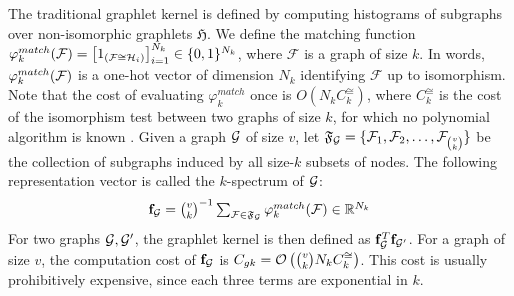 \documentclass{article}
\begin{document}
The traditional graphlet kernel is defined by computing histograms of subgraphs over non-isomorphic graphlets $\mathfrak{H}$. We define the matching function $\varphi_k^{match}(\mathcal{F}) = \left[ 1_{(\mathcal{F} \cong \mathcal{H}_i)}\right]_{i=1}^{N_k} \in \{0,1\}^{N_k}$, where $\mathcal{F}$ is a graph of size $k$. In words, $\varphi^{match}_k(\mathcal{F})$ is a one-hot vector of dimension $N_k$ identifying $\mathcal{F}$ up to isomorphism. Note that the cost of evaluating $\varphi_k^{match}$ once is $O\left(N_k C^{\cong}_k\right)$, where $C^{\cong}_k$ is the cost of the isomorphism test between two graphs of size $k$, for which no polynomial algorithm is known \cite{isomorphism_np}. 
%
Given a graph $\mathcal{G}$ of size $v$, let $\mathfrak{F}_{\mathcal{G}}=\{\mathcal{F}_1,\mathcal{F}_2,\ldots,\mathcal{F}_{\binom{v}{k}}\}$ be the collection of subgraphs induced by all size-$k$ subsets of nodes. The following representation vector is called the $k$-spectrum of $\mathcal{G}$:
\begin{equation}
\label{eq:gk}
\mathsmaller{\mathbf{f}_\G=\binom{v}{k}^{-1}\sum_{\mathcal{F}\in\mathfrak{F}_\mathcal{G}} \match (\mathcal{F}) \in \R^{N_k}}
\end{equation}
For two graphs $\mathcal{G},\mathcal{G}'$, the graphlet kernel \cite{graphlet_kernel} is then defined as $\mathbf{f}_{\mathcal{G}}^T\mathbf{f}_{\mathcal{G}'}$. %
For a graph of size $v$, the computation cost of $\mathbf{f}_{\mathcal{G}}$ is $C_{gk}= \mathcal{O}\left(\tbinom{v}{k}N_k C^{\cong}_k\right)$. This cost is usually prohibitively expensive, since each three terms are exponential in $k$.
\end{document}

